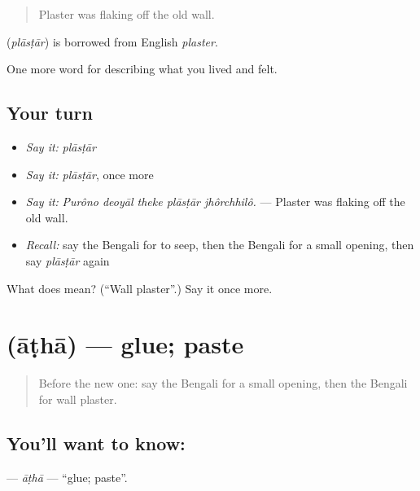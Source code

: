 \begin{quote}
Plaster was flaking off the old wall.
\end{quote}

\begin{cousinweb}
\textbf{} (\emph{plāsṭār}) is borrowed from English \emph{plaster}.
\end{cousinweb}

\begin{grammarlens}[title={What you've built}]
One more word for describing what you lived and felt.
\end{grammarlens}

\subsection*{Your turn}
\begin{itemize}
\raggedright
  \item \emph{Say it:} \emph{plāsṭār}
  \item \emph{Say it:} \emph{plāsṭār}, once more
  \item \emph{Say it:} \emph{Purôno deoyāl theke plāsṭār jhôrchhilô.} — Plaster was flaking off the old wall.
  \item \emph{Recall:} say the Bengali for to seep, then the Bengali for a small opening, then say \emph{plāsṭār} again
\end{itemize}

\begin{tcolorbox}[breakable,colback=teal!4,colframe=teal!35!black,title={Before you move on}]
What does  mean? (\textquotedblleft{}Wall plaster\textquotedblright{}.) Say it once more.
\end{tcolorbox}
\section[\texorpdfstring{\bn{আঠা} (āṭhā)}{আঠা (āṭhā)}]{ (āṭhā) — glue; paste}

\label{lesson:BN-C507-atha}



\begin{quote}
Before the new one: say the Bengali for a small opening, then the Bengali for wall plaster.
\end{quote}

\subsection*{You'll want to know: }
\textbf{} — \emph{āṭhā} — \textquotedblleft{}glue; paste\textquotedblright{}.

